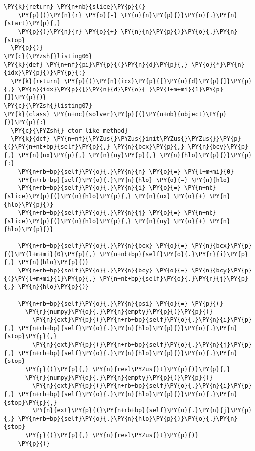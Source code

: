 \begin{Verbatim}[commandchars=\\\{\}]
  \PY{k}{return} \PY{n+nb}{slice}\PY{p}{(}
    \PY{p}{(}\PY{n}{r} \PY{o}{-} \PY{n}{n}\PY{p}{)}\PY{o}{.}\PY{n}{start}\PY{p}{,} 
    \PY{p}{(}\PY{n}{r} \PY{o}{+} \PY{n}{n}\PY{p}{)}\PY{o}{.}\PY{n}{stop}
  \PY{p}{)}
\PY{c}{\PYZsh{}listing06}
\PY{k}{def} \PY{n+nf}{pi}\PY{p}{(}\PY{n}{d}\PY{p}{,} \PY{o}{*}\PY{n}{idx}\PY{p}{)}\PY{p}{:} 
  \PY{k}{return} \PY{p}{(}\PY{n}{idx}\PY{p}{[}\PY{n}{d}\PY{p}{]}\PY{p}{,} \PY{n}{idx}\PY{p}{[}\PY{n}{d}\PY{o}{-}\PY{l+m+mi}{1}\PY{p}{]}\PY{p}{)}
\PY{c}{\PYZsh{}listing07}
\PY{k}{class} \PY{n+nc}{solver}\PY{p}{(}\PY{n+nb}{object}\PY{p}{)}\PY{p}{:}
  \PY{c}{\PYZsh{} ctor-like method}
  \PY{k}{def} \PY{n+nf}{\PYZus{}\PYZus{}init\PYZus{}\PYZus{}}\PY{p}{(}\PY{n+nb+bp}{self}\PY{p}{,} \PY{n}{bcx}\PY{p}{,} \PY{n}{bcy}\PY{p}{,} \PY{n}{nx}\PY{p}{,} \PY{n}{ny}\PY{p}{,} \PY{n}{hlo}\PY{p}{)}\PY{p}{:}
    \PY{n+nb+bp}{self}\PY{o}{.}\PY{n}{n} \PY{o}{=} \PY{l+m+mi}{0}
    \PY{n+nb+bp}{self}\PY{o}{.}\PY{n}{hlo} \PY{o}{=} \PY{n}{hlo}
    \PY{n+nb+bp}{self}\PY{o}{.}\PY{n}{i} \PY{o}{=} \PY{n+nb}{slice}\PY{p}{(}\PY{n}{hlo}\PY{p}{,} \PY{n}{nx} \PY{o}{+} \PY{n}{hlo}\PY{p}{)}
    \PY{n+nb+bp}{self}\PY{o}{.}\PY{n}{j} \PY{o}{=} \PY{n+nb}{slice}\PY{p}{(}\PY{n}{hlo}\PY{p}{,} \PY{n}{ny} \PY{o}{+} \PY{n}{hlo}\PY{p}{)}

    \PY{n+nb+bp}{self}\PY{o}{.}\PY{n}{bcx} \PY{o}{=} \PY{n}{bcx}\PY{p}{(}\PY{l+m+mi}{0}\PY{p}{,} \PY{n+nb+bp}{self}\PY{o}{.}\PY{n}{i}\PY{p}{,} \PY{n}{hlo}\PY{p}{)}
    \PY{n+nb+bp}{self}\PY{o}{.}\PY{n}{bcy} \PY{o}{=} \PY{n}{bcy}\PY{p}{(}\PY{l+m+mi}{1}\PY{p}{,} \PY{n+nb+bp}{self}\PY{o}{.}\PY{n}{j}\PY{p}{,} \PY{n}{hlo}\PY{p}{)}

    \PY{n+nb+bp}{self}\PY{o}{.}\PY{n}{psi} \PY{o}{=} \PY{p}{(}
      \PY{n}{numpy}\PY{o}{.}\PY{n}{empty}\PY{p}{(}\PY{p}{(}
        \PY{n}{ext}\PY{p}{(}\PY{n+nb+bp}{self}\PY{o}{.}\PY{n}{i}\PY{p}{,} \PY{n+nb+bp}{self}\PY{o}{.}\PY{n}{hlo}\PY{p}{)}\PY{o}{.}\PY{n}{stop}\PY{p}{,} 
        \PY{n}{ext}\PY{p}{(}\PY{n+nb+bp}{self}\PY{o}{.}\PY{n}{j}\PY{p}{,} \PY{n+nb+bp}{self}\PY{o}{.}\PY{n}{hlo}\PY{p}{)}\PY{o}{.}\PY{n}{stop}
      \PY{p}{)}\PY{p}{,} \PY{n}{real\PYZus{}t}\PY{p}{)}\PY{p}{,}
      \PY{n}{numpy}\PY{o}{.}\PY{n}{empty}\PY{p}{(}\PY{p}{(}
        \PY{n}{ext}\PY{p}{(}\PY{n+nb+bp}{self}\PY{o}{.}\PY{n}{i}\PY{p}{,} \PY{n+nb+bp}{self}\PY{o}{.}\PY{n}{hlo}\PY{p}{)}\PY{o}{.}\PY{n}{stop}\PY{p}{,} 
        \PY{n}{ext}\PY{p}{(}\PY{n+nb+bp}{self}\PY{o}{.}\PY{n}{j}\PY{p}{,} \PY{n+nb+bp}{self}\PY{o}{.}\PY{n}{hlo}\PY{p}{)}\PY{o}{.}\PY{n}{stop}
      \PY{p}{)}\PY{p}{,} \PY{n}{real\PYZus{}t}\PY{p}{)}
    \PY{p}{)}


\end{Verbatim}

